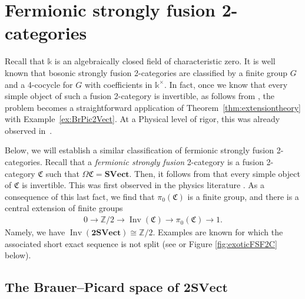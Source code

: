 \documentclass[pdftex]{sigma}
\numberwithin{equation}{section}
\begin{document}
\section{Fermionic strongly fusion 2-categories}\label{sec:FSF2Cs}

Recall that $\mathds{k}$ is an algebraically closed field of characteristic zero. It is well known that bosonic strongly fusion 2-categories are classified by a finite group $G$ and a 4-cocycle for $G$ with coefficients in $\mathds{k}^{\times}$. In fact, once we know that every simple object of such a fusion 2-category is invertible, as follows from \cite[Theorem~A]{JFY}, the problem becomes a straightforward application of Theorem~\ref{thm:extensiontheory} with Example~\ref{ex:BrPic2Vect}. At a Physical level of rigor, this was already observed in~\cite{LKW}.

Below, we will establish a similar classification of fermionic strongly fusion 2-categories. Recall that a \textit{fermionic strongly fusion} 2-category is a fusion 2-category $\mathfrak{C}$ such that $\Omega\mathfrak{C}=\mathbf{SVect}$. Then, it follows from \cite[Theorem~B]{JFY} that every simple object of $\mathfrak{C}$ is invertible. This was first observed in the physics literature \cite{LW}. As a consequence of this last fact, we find that $\pi_0(\mathfrak{C})$ is a finite group, and there is a central extension of finite groups
\begin{gather*}
0\rightarrow \mathbb{Z}/2\rightarrow \operatorname{Inv}(\mathfrak{C})\rightarrow \pi_0(\mathfrak{C})\rightarrow 1.
\end{gather*}
 Namely, we have $\operatorname{Inv}(\mathbf{2SVect})\cong \mathbb{Z}/2$. Examples are known for which the associated short exact sequence is not split (see \cite[Example 2.1.27]{DR} or Figure \ref{fig:exoticFSF2C} below).

\subsection[The Brauer--Picard space of 2SVect]{The Brauer--Picard space of $\mathbf{2SVect}$}\label{sub:fermionicclassification}
\end{document}
